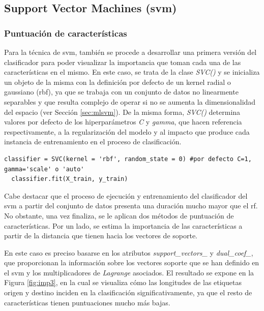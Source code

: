 \subsection{Support Vector Machines (\acrshort{svm})}
\label{sec:svm}

\subsubsection{Puntuación de características}
\label{sec:svm1}

Para la técnica de \gls{svm}, también se procede a desarrollar una primera versión del clasificador para poder visualizar la importancia que toman cada una de las características en el mismo. En este caso, se trata de la clase \textit{SVC()} \cite{svc} y se inicializa un objeto de la misma con la definición por defecto de un kernel radial o gaussiano (\gls{rbf}), ya que se trabaja con un conjunto de datos no linearmente separables y que resulta complejo de operar si no se aumenta la dimensionalidad del espacio (ver Sección \ref{sec:mlsvm}). De la misma forma, \textit{SVC()} determina valores por defecto de los hiperparámetros \textit{C} y \textit{gamma}, que hacen referencia respectivamente, a la regularización del modelo y al impacto que produce cada instancia de entrenamiento en el proceso de clasificación. 

\vspace{3mm}

\begin{lstlisting}[style=Python, caption={Clasificador SVM por defecto}]
  classifier = SVC(kernel = 'rbf', random_state = 0) #por defecto C=1, gamma='scale' o 'auto'
  classifier.fit(X_train, y_train)
\end{lstlisting}
  
\vspace{3mm}

Cabe destacar que el proceso de ejecución y entrenamiento del clasificador del \gls{svm} a partir del conjunto de datos presenta una duración mucho mayor que el \gls{rf}. No obstante, una vez finaliza, se le aplican dos métodos de puntuación de características. Por un lado, se estima la importancia de las características a partir de la distancia que tienen hacia los vectores de soporte. 

\vspace{3mm}

En este caso es preciso basarse en los atributos \textit{support\_vectors\_} y \textit{dual\_coef\_}, que proporcionan la información sobre los vectores soporte que se han definido en el \gls{svm} y los multiplicadores de \textit{Lagrange} asociados. El resultado se expone en la Figura \ref{fig:imp3}, en la cual se visualiza cómo las longitudes de las etiquetas origen y destino inciden en la clasificación significativamente, ya que el resto de características tienen puntuaciones mucho más bajas.

